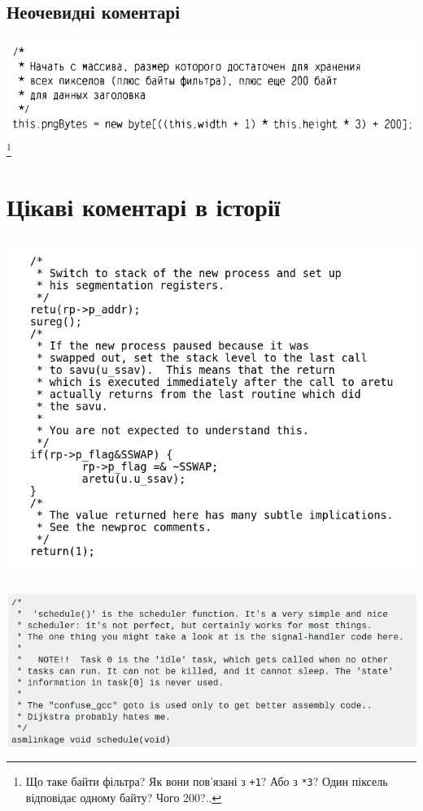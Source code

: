 \documentclass[12pt,pdf,utf8,ukrainian,aspectratio=169]{beamer}
\makeatletter
\newcommand*{\currentname}{\@currentlabelname}
\makeatother
\begin{document}
	\subsection{Неочевидні коментарі}
	\begin{frame}\frametitle{\currentname}
		\includegraphics[scale=0.6]{clean_code_18.png}
		\footnote{Що таке байти фільтра? Як вони пов'язані з \texttt{+1}?
		Або з \texttt{*3}? Один піксель відповідає одному байту? Чого 200?..}
		\hfill	
	\end{frame}

	\section{Цікаві коментарі в історії}
	\begin{frame}\frametitle{\currentname}
	\includegraphics[scale=0.6]{DMR_01.png}
	\end{frame}
	
	\begin{frame}\frametitle{\currentname}
		\includegraphics[scale=0.6]{Dij.png}
	\end{frame}
\end{document}
